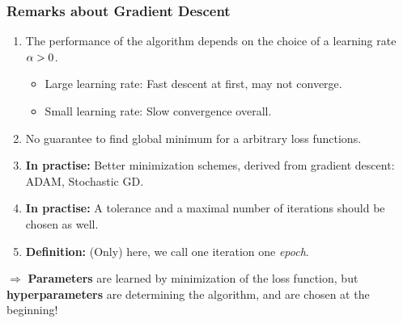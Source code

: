 \documentclass[10pt,hyperref={pdfpagelabels=false}]{beamer}
\begin{document}
\begin{frame}
\end{frame}
\begin{frame}
    \frametitle{Remarks about Gradient Descent}
        \begin{enumerate}
            \item The performance of the algorithm depends on the choice of a learning rate $\alpha>0$.
            \begin{itemize}
                \item Large learning rate: Fast descent at first, may not converge.
                \item Small learning rate: Slow convergence overall.
            \end{itemize}
            \item No guarantee to find global minimum for a arbitrary loss functions.
            \item {\bf In practise:} Better minimization schemes, derived from gradient descent: ADAM, Stochastic GD.
            \item {\bf In practise:} A tolerance and a maximal number of iterations should be chosen as well.
            \item {\bf Definition:} (Only) here, we call one iteration one \emph{epoch}.
        \end{enumerate}
    \centering $\boldsymbol{\Rightarrow}$ {\bf Parameters} are learned by minimization of the loss function, but {\bf hyperparameters} are determining the algorithm, and are chosen at the beginning!
\end{frame}
\end{document}

